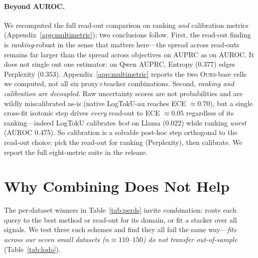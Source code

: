 \documentclass[11pt]{article}
\newcommand{\ours}{\textsc{Ours}}
\begin{document}
\paragraph{Beyond AUROC.} We recomputed the full read-out comparison on ranking
\emph{and} calibration metrics (Appendix~\ref{app:multimetric}); two conclusions follow.
First, the read-out finding is \emph{ranking}-robust in the sense that matters here---the
spread across read-outs remains far larger than the spread across objectives on AUPRC as on
AUROC. It does not single out one estimator: on Qwen AUPRC, Entropy ($0.377$) edges Perplexity
($0.353$). Appendix~\ref{app:multimetric} reports the two \ours-base cells we computed, not
all six proxy$\times$teacher combinations. Second, \emph{ranking and calibration are decoupled}. Raw
uncertainty scores are not probabilities and are wildly miscalibrated as-is (native
LogTokU-au reaches ECE $\approx 0.70$), but a single cross-fit isotonic step drives
\emph{every} read-out to ECE $\approx 0.05$ regardless of its ranking---indeed LogTokU
calibrates \emph{best} on Llama (0.022) while ranking \emph{worst} (AUROC 0.475). So
calibration is a solvable post-hoc step orthogonal to the read-out choice: pick the
read-out for ranking (Perplexity), then calibrate. We report the full eight-metric suite
in the release.

\section{Why Combining Does Not Help}\label{sec:combiners}
The per-dataset winners in Table~\ref{tab:perds} invite combination: route each query to
the best method or read-out for its domain, or fit a stacker over all signals. We test
three such schemes and find they all fail the same way---\emph{fits across our seven
small datasets ($n{\approx}110$--$150$) do not transfer out-of-sample}
(Table~\ref{tab:lodo}).
\end{document}
